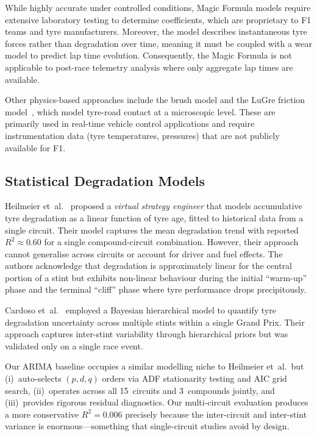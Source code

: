\documentclass[journal,twoside]{IEEEtran}
\begin{document}
While highly accurate under controlled conditions, Magic Formula models
require extensive laboratory testing to determine coefficients, which
are proprietary to F1 teams and tyre manufacturers.  Moreover, the
model describes instantaneous tyre forces rather than degradation
over time, meaning it must be coupled with a wear model to predict lap
time evolution.  Consequently, the Magic Formula is not applicable to
post-race telemetry analysis where only aggregate lap times are
available.

Other physics-based approaches include the brush model and the LuGre
friction model~\cite{canudas1995new}, which model tyre-road contact
at a microscopic level.  These are primarily used in real-time vehicle
control applications and require instrumentation data (tyre
temperatures, pressures) that are not publicly available for F1.

\subsection{Statistical Degradation Models}

Heilmeier et~al.~\cite{heilmeier2020race} proposed a \emph{virtual
strategy engineer} that models accumulative tyre degradation as a
linear function of tyre age, fitted to historical data from a single
circuit.  Their model captures the mean degradation trend with reported
$R^{2}\approx0.60$ for a single compound-circuit combination.  However,
their approach cannot generalise across circuits or account for driver
and fuel effects.  The authors acknowledge that degradation is
approximately linear for the central portion of a stint but exhibits
non-linear behaviour during the initial ``warm-up'' phase and the
terminal ``cliff'' phase where tyre performance drops precipitously.

Cardoso et~al.~\cite{cardoso2023bayesian} employed a Bayesian
hierarchical model to quantify tyre degradation uncertainty across
multiple stints within a single Grand Prix.  Their approach captures
inter-stint variability through hierarchical priors but was validated
only on a single race event.

Our ARIMA baseline occupies a similar modelling niche to Heilmeier
et~al.\ but (i)~auto-selects $(p,d,q)$ orders via ADF stationarity
testing and AIC grid search, (ii)~operates across all 15~circuits and
3~compounds jointly, and (iii)~provides rigorous residual diagnostics.
Our multi-circuit evaluation produces a more conservative
$R^{2}=0.006$ precisely because the inter-circuit and inter-stint
variance is enormous---something that single-circuit studies avoid by
design.
\end{document}
